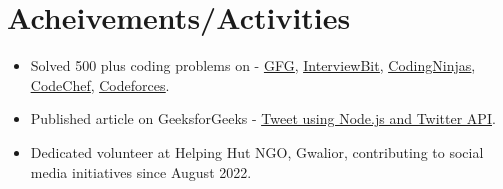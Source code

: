 \documentclass[a4paper,11pt]{article}
\newcommand{\resumeItem}[1]{
  \item\small{#1}
}
\newcommand{\resumeItemListStart}{\begin{itemize}[rightmargin=0.11in]}
\newcommand{\resumeItemListEnd}{\end{itemize}}
\begin{document}

\section{Acheivements/Activities}
  \resumeItemListStart{}
    \resumeItem{Solved 500 plus coding problems on - {\href{https://auth.geeksforgeeks.org/user/jpatidar98261}{\uline{GFG}}}, {\href{https://www.interviewbit.com/profile/jayant-patidar_460}{\uline{InterviewBit}}}, {\href{https://www.codingninjas.com/studio/profile/552e45e0-8a76-41bd-ba63-4b1e48570a62}{\uline{CodingNinjas}}}, {\href{https://www.codechef.com/users/jpatidar9826}{\uline{CodeChef}}}, {\href{https://codeforces.com/profile/jpatidar9826}{\uline{Codeforces}}}.}
    \resumeItem{Published article on GeeksforGeeks - {\href{https://www.geeksforgeeks.org/tweet-using-node-js-and-twitter-api/}{\uline{Tweet using Node.js and Twitter API}}}.}   
    \resumeItem{Dedicated volunteer at Helping Hut NGO, Gwalior, contributing to social media initiatives since August 2022.}
  \resumeItemListEnd{}
\end{document}
